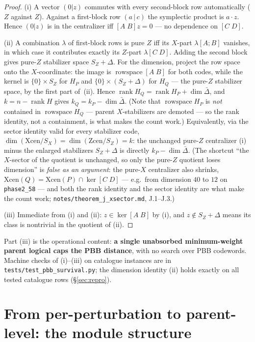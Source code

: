 \documentclass[11pt]{article}
\theoremstyle{plain}
\theoremstyle{remark}
\begin{document}
\begin{proof}
(i) A vector $(0|z)$ commutes with every second-block row automatically ($Z$
against $Z$). Against a first-block row $(a\,|\,c)$ the symplectic product is $a\cdot z$.
Hence $(0|z)$ is in the centralizer iff $[A\;B]z=0$ --- no dependence on $[C\;D]$.

(ii) A combination $\lambda$ of first-block rows is pure $Z$ iff its $X$-part
$\lambda[A;B]$ vanishes, in which case it contributes exactly its $Z$-part
$\lambda[C\;D]$. Adding the second block gives pure-$Z$ stabilizer space $S_Z+\Delta$.
For the dimension, project the row space onto the $X$-coordinate: the image is
$\operatorname{rowspace}[A\;B]$ for both codes, while the kernel is $\{0\}\times S_Z$
for $H_P$ and $\{0\}\times(S_Z+\Delta)$ for $H_Q$ --- the pure-$Z$ stabilizer space,
by the first part of~(ii).  Hence
$\operatorname{rank}H_Q=\operatorname{rank}H_P+\dim\bar\Delta$, and
$k=n-\operatorname{rank}H$ gives $k_Q=k_P-\dim\bar\Delta$.  (Note that
$\operatorname{rowspace}H_P$ is \emph{not} contained in $\operatorname{rowspace}H_Q$
--- parent $X$-stabilizers are demoted --- so the rank identity, not a containment,
is what makes the count work.)  Equivalently, via the
sector identity valid for every stabilizer code,
$\dim(\mathrm{Xcen}/S_X)=\dim(\mathrm{Zcen}/S_Z)=k$: the unchanged pure-$Z$
centralizer (i) minus the enlarged stabilizers $S_Z+\Delta$ is directly
$k_P-\dim\bar\Delta$.  (The shortcut ``the $X$-sector of the quotient is unchanged,
so only the pure-$Z$ quotient loses dimension'' is \emph{false as an argument}: the
pure-$X$ centralizer also shrinks, $\mathrm{Xcen}(Q)=\mathrm{Xcen}(P)\cap\ker[C\;D]$
--- e.g.\ from dimension $40$ to $12$ on \texttt{phase2\_58} --- and both the rank
identity and the sector identity are what make the count work;
\texttt{notes/theorem\_j\_xsector.md}, J.1--J.3.)

(iii) Immediate from (i) and (ii): $z\in\ker[A\;B]$ by (i), and $z\notin S_Z+\Delta$
means its class is nontrivial in the quotient of (ii).
\end{proof}

Part (iii) is the operational content: \textbf{a single unabsorbed minimum-weight parent
logical caps the PBB distance}, with no search over PBB codewords. Machine checks of
(i)--(iii) on catalogue instances are in \texttt{tests/test\_pbb\_survival.py}; the dimension
identity (ii) holds exactly on all tested catalogue rows (\S\ref{sec:repro}).

\section{From per-perturbation to parent-level: the module structure}\label{sec:module}
\end{document}
